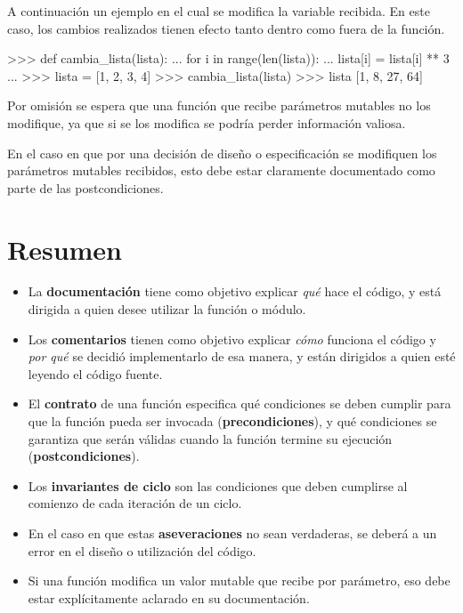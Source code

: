 A continuación un ejemplo en el cual se modifica la variable recibida. En este
caso, los cambios realizados tienen efecto tanto dentro como fuera de la
función.

\begin{codigo-python-sn}
>>> def cambia_lista(lista):
...     for i in range(len(lista)):
...         lista[i] = lista[i] ** 3
...
>>> lista = [1, 2, 3, 4]
>>> cambia_lista(lista)
>>> lista
[1, 8, 27, 64]
\end{codigo-python-sn}

\begin{atencion}
Por omisión se espera que una función que recibe parámetros mutables no los
modifique, ya que si se los modifica se podría perder información valiosa.

En el caso en que por una decisión de diseño o especificación se modifiquen
los parámetros mutables recibidos, esto debe estar claramente documentado
como parte de las postcondiciones.
\end{atencion}

\section{Resumen}

\begin{itemize}
\item La \textbf{documentación} tiene como objetivo explicar \emph{qué} hace el código,
    y está dirigida a quien desee utilizar la función o módulo.
\item Los \textbf{comentarios} tienen como objetivo explicar \emph{cómo} funciona el
    código y \emph{por qué} se decidió implementarlo de esa manera, y están dirigidos a
    quien esté leyendo el código fuente.
\item El \textbf{contrato} de una función especifica qué condiciones se deben
    cumplir para que la función pueda ser invocada (\textbf{precondiciones}),
    y qué condiciones se garantiza que serán válidas cuando la función termine
    su ejecución (\textbf{postcondiciones}).
\item Los \textbf{invariantes de ciclo} son las condiciones que deben
cumplirse al comienzo de cada iteración de un ciclo.
\item En el caso en que estas \textbf{aseveraciones} no sean verdaderas, se
deberá a un error en el diseño o utilización del código.
\item Si una función modifica un valor mutable que recibe por parámetro, eso
    debe estar explícitamente aclarado en su documentación.
\end{itemize}

